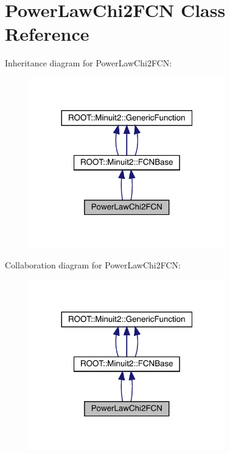 \hypertarget{classPowerLawChi2FCN}{}\section{Power\+Law\+Chi2\+F\+CN Class Reference}
\label{classPowerLawChi2FCN}


Inheritance diagram for Power\+Law\+Chi2\+F\+CN\+:
\nopagebreak
\begin{figure}[H]
\begin{center}
\leavevmode
\includegraphics[width=240pt]{d8/d55/classPowerLawChi2FCN__inherit__graph}
\end{center}
\end{figure}


Collaboration diagram for Power\+Law\+Chi2\+F\+CN\+:
\nopagebreak
\begin{figure}[H]
\begin{center}
\leavevmode
\includegraphics[width=240pt]{d1/d7d/classPowerLawChi2FCN__coll__graph}
\end{center}
\end{figure}

